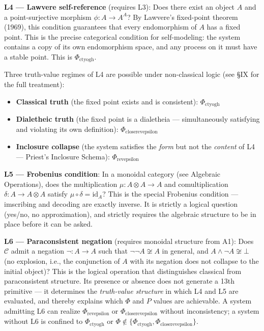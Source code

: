 \documentclass[12pt,a4paper]{article}
\newcommand{\pilcrow}{\S}
\begin{document}
\textbf{L4 --- Lawvere self-reference} (requires L3): Does there exist an object $A$ and a point-surjective morphism $\phi: A \to A^A$? By Lawvere's fixed-point theorem (1969), this condition guarantees that every endomorphism of $A$ has a fixed point. This is the precise categorical condition for self-modeling: the system contains a copy of its own endomorphism space, and any process on it must have a stable point. This is $\Phi_{\text{ctyogh}}$.

Three truth-value regimes of L4 are possible under non-classical logic (see \pilcrow{}IX for the full treatment):

\begin{itemize}
    \item \textbf{Classical truth} (the fixed point exists and is consistent): $\Phi_{\text{ctyogh}}$
    \item \textbf{Dialetheic truth} (the fixed point is a dialetheia --- simultaneously satisfying and violating its own definition): $\Phi_{\text{closerevepsilon}}$
    \item \textbf{Inclosure collapse} (the system satisfies the \emph{form} but not the \emph{content} of L4 --- Priest's Inclosure Schema): $\Phi_{\text{revepsilon}}$
\end{itemize}

\textbf{L5 --- Frobenius condition}: In a monoidal category (see Algebraic Operations), does the multiplication $\mu: A \otimes A \to A$ and comultiplication $\delta: A \to A \otimes A$ satisfy $\mu \circ \delta = \text{id}_A$? This is the special Frobenius condition --- imscribing and decoding are exactly inverse. It is strictly a logical question (yes/no, no approximation), and strictly requires the algebraic structure to be in place before it can be asked.

\textbf{L6 --- Paraconsistent negation} (requires monoidal structure from A1): Does $\mathcal{C}$ admit a negation $\neg: A \to A$ such that $\neg\neg A \not\cong A$ in general, and $A \wedge \neg A \not\cong \bot$ (no explosion, i.e., the conjunction of $A$ with its negation does not collapse to the initial object)? This is the logical operation that distinguishes classical from paraconsistent structure. Its presence or absence does not generate a 13th primitive --- it determines the \emph{truth-value structure} in which L4 and L5 are evaluated, and thereby explains which $\Phi$ and $P$ values are achievable. A system admitting L6 can realize $\Phi_{\text{revepsilon}}$ or $\Phi_{\text{closerevepsilon}}$ without inconsistency; a system without L6 is confined to $\Phi_{\text{ctyogh}}$ or $\Phi \notin \{\Phi_{\text{ctyogh}}, \Phi_{\text{closerevepsilon}}\}$.
\end{document}
